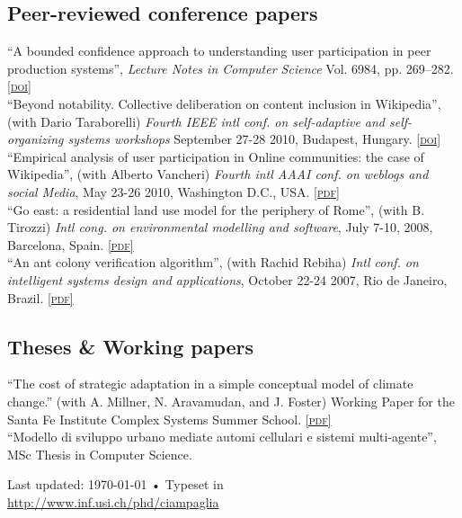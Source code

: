 \documentclass[10pt, a4paper]{article}
\newcommand{\pdf}[1]{\href{#1}{\scriptsize\textsc{[pdf]}}}
\newcommand{\doi}[1]{\href{#1}{\scriptsize\textsc{[doi]}}}
\newcommand{\years}[1]{\marginnote{\scriptsize #1}}
\begin{document}
\subsection*{Peer-reviewed conference papers}
\noindent
\years{2011} ``A bounded confidence approach to understanding user participation
in peer production systems'', \emph{Lecture Notes in Computer Science} Vol.
6984, pp. 269--282. \doi{http://dx.doi.org/10.1007/978-3-642-24704-0\_29}\\
%
\years{2010b} ``Beyond notability. Collective deliberation on content inclusion
in Wikipedia'', (with Dario Taraborelli) \emph{Fourth IEEE intl conf. on
self-adaptive and self-organizing systems workshops} September 27-28 2010,
Budapest, Hungary. \doi{http://dx.doi.org/10.1109/SASOW.2010.26}\\
%
\years{2010a} ``Empirical analysis of user participation in Online communities:
the case of Wikipedia'', (with Alberto Vancheri) \emph{Fourth intl AAAI conf. on
weblogs and social Media}, May 23-26 2010, Washington D.C., USA.
\pdf{http://www.aaai.org/ocs/index.php/ICWSM/ICWSM10/paper/download/1517/1861}\\
%
\years{2008} ``Go east: a residential land use model for the periphery of
Rome'', (with B. Tirozzi) \emph{Intl cong. on environmental modelling and
software}, July 7-10, 2008, Barcelona, Spain.
\pdf{http://www.inf.usi.ch/phd/ciampaglia/papers/RomeModel2008.pdf}\\
%
\years{2007} ``An ant colony verification algorithm'', (with Rachid Rebiha)
\emph{Intl conf. on intelligent systems design and applications}, October 22-24
2007, Rio de Janeiro, Brazil.
\pdf{http://www.inf.usi.ch/phd/ciampaglia/papers/RebihaACOVerification07.pdf}\\

\subsection*{Theses \& Working papers}
\noindent
\years{2008} ``The cost of strategic adaptation in a simple conceptual model of
climate change.'' (with A. Millner, N. Aravamudan, and J. Foster) Working Paper
for the Santa Fe Institute Complex Systems Summer School.
\pdf{http://www.santafe.edu/events/workshops/images/3/32/Simpleclimatechange.pdf}\\
%
\years{2006} ``Modello di sviluppo urbano mediate automi cellulari e sistemi
multi-agente'', MSc Thesis in Computer Science.\\

\vfill{}

\begin{center}
{\scriptsize  Last updated: \today\- •\- 
Typeset in { \XeTeX}\\
\href{http://www.inf.usi.ch/phd/ciampaglia}{http://www.inf.usi.ch/phd/ciampaglia}}
\end{center}
\end{document}

